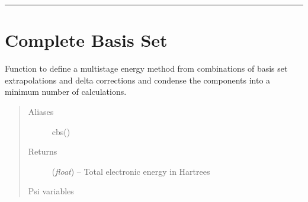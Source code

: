 \documentclass[letterpaper,10pt,english]{sphinxmanual}
\begin{document}
\bigskip\hrule{}\bigskip



\chapter{Complete Basis Set}
\label{index:complete-basis-set}

\begin{fulllineitems}
\label{index:wrappers.complete_basis_set}
Function to define a multistage energy method from combinations of
basis set extrapolations and delta corrections and condense the
components into a minimum number of calculations.
\begin{quote}\begin{description}
\item[{Aliases }] \leavevmode
cbs()

\item[{Returns}] \leavevmode
(\emph{float}) -- Total electronic energy in Hartrees

\item[{Psi variables}] \leavevmode
\end{description}\end{quote}

\begin{fulllineitems}
\label{index:envvar-CBSTOTALENERGY}\label{index:envvar-CBSREFERENCEENERGY}\label{index:envvar-CBSCORRELATIONENERGY}\label{index:envvar-CURRENTENERGY}\label{index:envvar-CURRENTREFERENCEENERGY}\label{index:envvar-CURRENTCORRELATIONENERGY}
\end{fulllineitems}



\end{fulllineitems}
\end{document}
